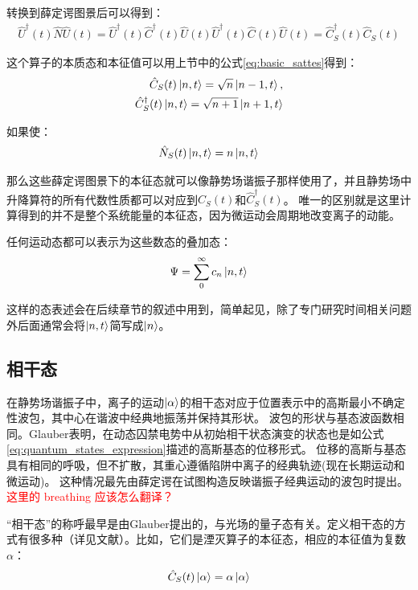 转换到薛定谔图景后可以得到：
\begin{align}
    \hat{U}^\dagger(t)\hat{N}\hat{U}(t)=\hat{U}^\dagger(t)\hat{C}^\dagger(t)\hat{U}(t) \hat{U}^\dagger(t)\hat{C}(t)\hat{U}(t) = \hat{C}_S^\dagger(t)\hat{C}_S(t)
\end{align}

这个算子的本质态和本征值可以用上节中的公式\eqref{eq:basic_sattes}得到：
\begin{align}
    \hat{C}_S(t)\ket{n,t}=\sqrt{n}\ket{n-1,t},\\
    \hat{C}_S^\dagger(t)\ket{n,t}=\sqrt{n+1}\ket{n+1,t}
\end{align}

如果使：
\begin{align}
    \hat{N}_S(t)\ket{n,t}=n\ket{n,t}
\end{align}

那么这些薛定谔图景下的本征态就可以像静势场谐振子那样使用了，并且静势场中升降算符的所有代数性质都可以对应到$\hat{C}_S(t)$和$\hat{C}_S^\dagger(t)$。
唯一的区别就是这里计算得到的并不是整个系统能量的本征态，因为微运动会周期地改变离子的动能。

任何运动态都可以表示为这些数态的叠加态：
\begin{align}
    \Psi = \sum_{0}^{\infty}c_n\ket{n,t}\label{eq:superposition_states}
\end{align}

这样的态表述会在后续章节的叙述中用到，简单起见，除了专门研究时间相关问题外后面通常会将$\ket{n,t}$简写成$\ket{n}$。






\subsection[相干态]{相干态}

在静势场谐振子中，离子的运动$\ket{\alpha}$的相干态对应于位置表示中的高斯最小不确定性波包，其中心在谐波中经典地振荡并保持其形状。
波包的形状与基态波函数相同。Glauber表明，在动态囚禁电势中从初始相干状态演变的状态也是如公式\eqref{eq:quantum_states_expression}描述的高斯基态的位移形式\cite[]{Arimondo_Phillips_Strumia_1992}。
位移的高斯与基态具有相同的呼吸，但不扩散，其重心遵循陷阱中离子的经典轨迹(现在长期运动和微运动)。
这种情况最先由薛定谔在试图构造反映谐振子经典运动的波包时提出\cite[]{Schrödinger1926}。
\textcolor{red}{这里的 breathing 应该怎么翻译？}

“相干态”的称呼最早是由Glauber提出的\cite[]{Glauber1963Photon,Dewitt_Blandin_Cohen_Tannoudji}，与光场的量子态有关。定义相干态的方式有很多种（详见文献\cite[]{Klauder_Skagerstam_1985}）。比如，它们是湮灭算子的本征态，相应的本征值为复数$\alpha$：
\begin{align}
    \hat{C}_S(t)\ket{\alpha}=\alpha\ket{\alpha}
\end{align}

